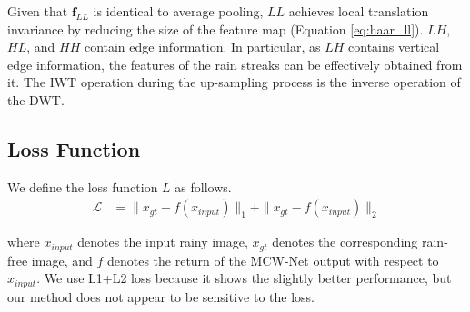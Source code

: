 \documentclass[a4paper,fleqn]{cas-dc}
\begin{document}
Given that $\mathbf{f}_{LL}$ is identical to average pooling, $LL$ achieves local translation invariance by reducing the size of the feature map (Equation \ref{eq:haar_ll}). $LH$, $HL$, and $HH$ contain edge information. In particular, as $LH$ contains vertical edge information, the features of the rain streaks can be effectively obtained from it. The IWT operation during the up-sampling process is the inverse operation of the DWT.


















\subsection{Loss Function}
We define the loss function $L$ as follows. 
\begin{align}
\mathcal {L} &= \| x_{gt}-f (x_{input}) \| _{1} + \| x_{gt}-f (x_{input}) \| _{2}
\end{align}

where $x_{input}$ denotes the input rainy image, $x_{gt}$ denotes the corresponding rain-free image, and $f$ denotes the return of the MCW-Net output with respect to $x_{input}$. We use L1+L2 loss because it shows the slightly better performance, but our method does not appear to be sensitive to the loss.
\end{document}
